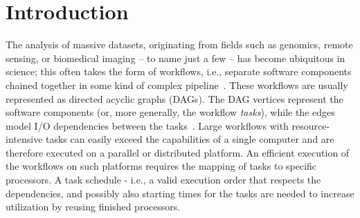 \documentclass[conference]{IEEEtran}
\newcommand{\new}[1]{{\color{blue}#1}}
\newcommand{\skug}[1]{{\color{blue}[SK: #1]}}
\renewcommand{\iec}{i.e., }
\begin{document}
\begin{abstract}

\end{abstract}


\section{Introduction} %

The analysis of massive datasets, originating from fields such as genomics, 
remote sensing, or biomedical imaging -- to name just a few -- has become ubiquitous in science;
this often takes the form of workflows, \iec separate software components chained together
in some kind of complex pipeline~\cite{DBLP:journals/dbsk/LeserHDEGHKKKKK21}.
These workflows are usually represented as directed acyclic graphs (DAGs).
The DAG vertices represent the software components (or, more generally, the workflow \emph{tasks}),
while the edges model I/O dependencies between the tasks~\cite{adhikari2019survey,liu2018survey}.
Large workflows with resource-intensive tasks can easily exceed the capabilities of a 
single computer and are therefore executed on a parallel or distributed platform.
An efficient execution of the workflows on such platforms requires the mapping of tasks
to specific processors.
\new{A task schedule - \iec a valid execution order that respects the dependencies,  and possibly also starting times for
the tasks are needed to increase utilization by reusing finished processors.}
\end{document}
